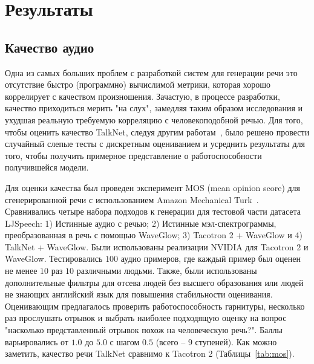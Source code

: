 \section{Результаты}

\subsection{Качество аудио}

Одна из самых больших проблем с разработкой систем для генерации речи это отсутствие быстро (программно) вычислимой метрики, которая хорошо коррелирует с качеством произношения. Зачастую, в процессе разработки, качество приходиться мерить "на слух", замедляя таким образом исследования и ухудшая реальную требуемую корреляцию с человекоподобной речью. Для того, чтобы оценить качество TalkNet, следуя другим работам~\cite{fastspeech, tacotron2}, было решено провести случайный слепые тесты с дискретным оцениванием и усреднить результаты для того, чтобы получить примерное представление о работоспособности получившейся модели.

Для оценки качества был проведен эксперимент MOS (mean opinion score) для сгенерированной речи с использованием Amazon Mechanical Turk~\cite{mturk}. Сравнивались четыре набора подходов к генерации для тестовой части датасета LJSpeech: 1) Истинные аудио с речью; 2) Истинные мэл-спектрограммы, преобразованная в речь с помощью WaveGlow; 3) Tacotron 2 + WaveGlow и 4) TalkNet + WaveGlow. Были использованы реализации NVIDIA для Tacotron 2 и WaveGlow. Тестировались $100$ аудио примеров, где каждый пример был оценен не менее $10$ раз $10$ различными людьми. Также, были использованы дополнительные фильтры для отсева людей без высшего образования или людей не знающих английский язык для повышения стабильности оценивания. Оценивающим предлагалось проверить работоспособность гарнитуры, несколько раз прослушать отрывок и выбрать наиболее подходящую оценку на вопрос "насколько представленный отрывок похож на человеческую речь?". Баллы варьировались от $1.0$ до $5.0$ с шагом $0.5$ (всего -- 9 ступеней). Как можно заметить, качество речи TalkNet сравнимо к Tacotron 2 (Таблицы~\ref{tab:mos}).

\begin{table}[!ht]
\centering
{}
\caption{Усредненные оценки MOS (mean opinion score) с $95\%$ доверительным интервалом}
\label{tab:mos}
\end{table}

